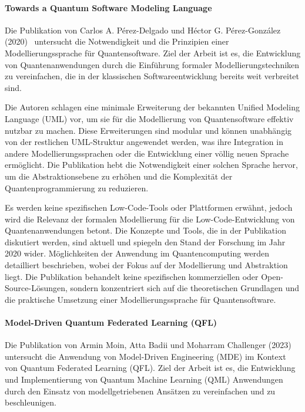 \paragraph{Towards a Quantum Software Modeling Language}

Die Publikation von Carlos A. Pérez-Delgado und Héctor G. Pérez-González (2020)~\cite{Perez-Delgado_2020} untersucht die Notwendigkeit und die 
Prinzipien einer Modellierungssprache für Quantensoftware. Ziel der Arbeit ist es, die Entwicklung von 
Quantenanwendungen durch die Einführung formaler Modellierungstechniken zu vereinfachen, die in der 
klassischen Softwareentwicklung bereits weit verbreitet sind.

Die Autoren schlagen eine minimale Erweiterung der bekannten Unified Modeling Language (UML) vor, um sie für die 
Modellierung von Quantensoftware effektiv nutzbar zu machen. Diese Erweiterungen sind modular und können unabhängig 
von der restlichen UML-Struktur angewendet werden, was ihre Integration in andere Modellierungssprachen 
oder die Entwicklung einer völlig neuen Sprache ermöglicht. Die Publikation hebt die Notwendigkeit einer solchen Sprache 
hervor, um die Abstraktionsebene zu erhöhen und die Komplexität der Quantenprogrammierung zu reduzieren.

Es werden keine spezifischen Low-Code-Tools oder Plattformen erwähnt, jedoch wird die Relevanz der 
formalen Modellierung für die Low-Code-Entwicklung von Quantenanwendungen betont. 
Die Konzepte und Tools, die in der Publikation diskutiert werden, sind aktuell und spiegeln den Stand der Forschung im Jahr 2020 wider. 
Möglichkeiten der Anwendung im Quantencomputing werden detailliert beschrieben, wobei der Fokus auf der Modellierung 
und Abstraktion liegt. Die Publikation behandelt keine spezifischen kommerziellen oder Open-Source-Lösungen, sondern 
konzentriert sich auf die theoretischen Grundlagen und die praktische Umsetzung einer Modellierungssprache für Quantensoftware.

\paragraph{Model-Driven Quantum Federated Learning (QFL)}

Die Publikation von Armin Moin, Atta Badii und Moharram Challenger (2023)~\cite{Moin_2023} untersucht die Anwendung von 
Model-Driven Engineering (MDE) im Kontext von Quantum Federated Learning (QFL). Ziel der Arbeit ist es, die Entwicklung und 
Implementierung von Quantum Machine Learning (QML) Anwendungen durch den Einsatz von modellgetriebenen Ansätzen zu vereinfachen und zu beschleunigen.

